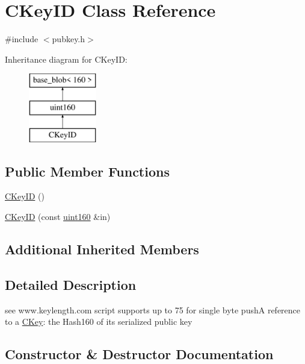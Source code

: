 \hypertarget{class_c_key_i_d}{}\section{C\+Key\+ID Class Reference}
\label{class_c_key_i_d}


{\ttfamily \#include $<$pubkey.\+h$>$}

Inheritance diagram for C\+Key\+ID\+:\begin{figure}[H]
\begin{center}
\leavevmode
\includegraphics[height=3.000000cm]{class_c_key_i_d}
\end{center}
\end{figure}
\subsection*{Public Member Functions}
\begin{DoxyCompactItemize}
\item 
\mbox{\hyperlink{class_c_key_i_d_a01dbd3c37820a2ffe89d106c6a7cf53d}{C\+Key\+ID}} ()
\item 
\mbox{\hyperlink{class_c_key_i_d_a695f373e11730318f9103100fa006a7e}{C\+Key\+ID}} (const \mbox{\hyperlink{classuint160}{uint160}} \&in)
\end{DoxyCompactItemize}
\subsection*{Additional Inherited Members}


\subsection{Detailed Description}
see www.\+keylength.\+com script supports up to 75 for single byte pushA reference to a \mbox{\hyperlink{class_c_key}{C\+Key}}\+: the Hash160 of its serialized public key 

\subsection{Constructor \& Destructor Documentation}
\mbox{\label{class_c_key_i_d_a01dbd3c37820a2ffe89d106c6a7cf53d}} 
